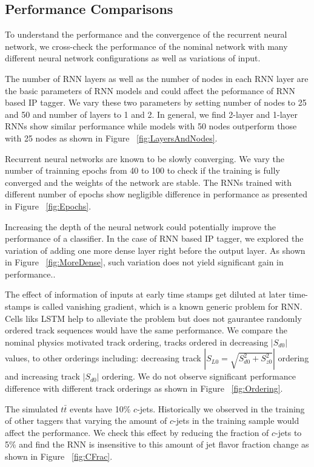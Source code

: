 \subsection{Performance Comparisons} \label{subsec:perfcomp}
To understand the performance and the convergence of the recurrent neural network, we cross-check the performance of the nominal network with many different neural network configurations as well as variations of input. 

The number of RNN layers as well as the number of nodes in each RNN layer are the basic parameters of RNN models and could affect the peformance of RNN based IP tagger. We vary these two parameters by setting number of nodes to 25 and 50 and number of layers to 1 and 2. In general, we find 2-layer and 1-layer RNNs show similar performance while models with 50 nodes outperform those with 25 nodes as shown in Figure ~\ref{fig:LayersAndNodes}. 

Recurrent neural networks are known to be slowly converging. We vary the number of trainning epochs from 40 to 100 to check if the training is fully converged and the weights of the network are stable. The RNNs trained with different number of epochs show negligible difference in performance as presented in Figure ~\ref{fig:Epochs}. 

Increasing the depth of the neural network could potentially improve the performance of a classifier. In the case of RNN based IP tagger, we explored the variation of adding one more dense layer right before the output layer. As shown in Figure ~\ref{fig:MoreDense}, such variation does not yield significant gain in performance..

The effect of information of inputs at early time stamps get diluted at later time-stamps is called vanishing gradient, which is a known generic problem for RNN. Cells liks LSTM help to alleviate the problem but does not gaurantee randomly ordered track sequences would have the same performance. We compare the nominal physics motivated track ordering, tracks ordered in decreasing $|S_{d0}|$ values, to other orderings including: decreasing track $|S_{L0} = \sqrt{S_{d0}^2+S_{z0}^2}|$ ordering and increasing track $|S_{d0}|$ ordering. We do not observe significant performance difference with different track orderings as shown in Figure ~\ref{fig:Ordering}. 

The simulated $t\bar t$ events have 10\% $c$-jets. Historically we observed in the training of other taggers that varying the amount of $c$-jets in the training sample would affect the performance. We check this effect by reducing the fraction of $c$-jets to 5\% and find the RNN is insensitive to this amount of jet flavor fraction change as shown in Figure ~\ref{fig:CFrac}.

